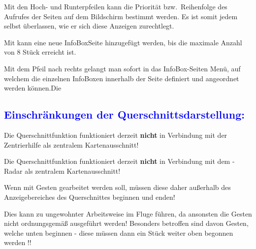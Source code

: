 

Mit den Hoch- und Runterpfeilen kann die Priorität bzw.\ Reihenfolge des Aufrufes der Seiten
auf dem Bildschirm bestimmt werden.  Es ist somit jedem selbst überlassen, wie er sich diese
Anzeigen zurechtlegt.

Mit  kann eine neue InfoBoxSeite hinzugefügt werden, bis die maximale
Anzahl von 8 Stück erreicht ist.

Mit dem Pfeil nach rechts gelangt man sofort in das InfoBox-Seiten Menü, auf welchem die
einzelnen InfoBoxen innerhalb der Seite definiert und angeordnet  werden können.Die

 \subsection*{\textcolor{blue}{\textbf{{\large Einschränkungen der
Querschnittsdarstellung:}}}}

Die Querschnittfunktion funktioniert derzeit \textbf{nicht} in Verbindung mit der Zentrierhilfe als zentralem Kartenausschnitt!

Die Querschnittfunktion funktioniert derzeit \textbf{nicht} in Verbindung mit dem \fl-Radar als zentralem 
Kartenausschnitt!


Wenn mit Gesten gearbeitet werden soll, müssen diese daher außerhalb des
Anzeigebereiches des Querschnittes beginnen und enden!

Dies kann zu ungewohnter Arbeitsweise im Fluge führen, da ansonsten die Gesten nicht
ordnungsgemäß ausgeführt werden! Besonders betroffen sind davon Gesten, welche unten
beginnen - diese müssen dann ein Stück weiter oben begonnen werden !!

